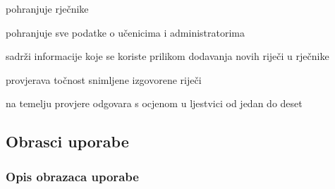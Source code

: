 \begin{packed_enum}
\begin{packed_enum}
			\end{packed_enum}
		
			
			\item  {}
		
			\begin{packed_enum}
			
			\item pohranjuje rječnike
			\item pohranjuje sve podatke o učenicima i administratorima
			
			\end{packed_enum}
		
			
			\item  {}
		
			\begin{packed_enum}
			
			\item sadrži informacije koje se koriste prilikom dodavanja novih riječi u rječnike
			
			\end{packed_enum}
		
			
			\item  {}
	
			\begin{packed_enum}
		
			\item provjerava točnost snimljene izgovorene riječi
			\item na temelju provjere odgovara s ocjenom u ljestvici od jedan do deset
		
			\end{packed_enum}		
		
	
			\end{packed_enum}
			
			\eject 
			
						
			\subsection{Obrasci uporabe}
					
				\subsubsection{Opis obrazaca uporabe}		

